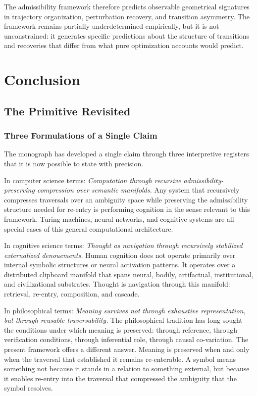 \documentclass[12pt,oneside]{book}
\theoremstyle{plain}
\theoremstyle{definition}
\theoremstyle{plain}
\begin{document}
The admissibility framework therefore predicts observable geometrical signatures in trajectory organization, perturbation recovery, and transition asymmetry. The framework remains partially underdetermined empirically, but it is not unconstrained: it generates specific predictions about the structure of transitions and recoveries that differ from what pure optimization accounts would predict.

\part{Conclusion}

\chapter{The Primitive Revisited}
\label{ch:conclusion}

\section{Three Formulations of a Single Claim}

The monograph has developed a single claim through three interpretive registers that it is now possible to state with precision.

In computer science terms: \textit{Computation through recursive admissibility-preserving compression over semantic manifolds.} Any system that recursively compresses traversals over an ambiguity space while preserving the admissibility structure needed for re-entry is performing cognition in the sense relevant to this framework. Turing machines, neural networks, and cognitive systems are all special cases of this general computational architecture.

In cognitive science terms: \textit{Thought as navigation through recursively stabilized externalized denouements.} Human cognition does not operate primarily over internal symbolic structures or neural activation patterns. It operates over a distributed clipboard manifold that spans neural, bodily, artifactual, institutional, and civilizational substrates. Thought is navigation through this manifold: retrieval, re-entry, composition, and cascade.

In philosophical terms: \textit{Meaning survives not through exhaustive representation, but through reusable traversability.} The philosophical tradition has long sought the conditions under which meaning is preserved: through reference, through verification conditions, through inferential role, through causal co-variation. The present framework offers a different answer. Meaning is preserved when and only when the traversal that established it remains re-enterable. A symbol means something not because it stands in a relation to something external, but because it enables re-entry into the traversal that compressed the ambiguity that the symbol resolves.
\end{document}
